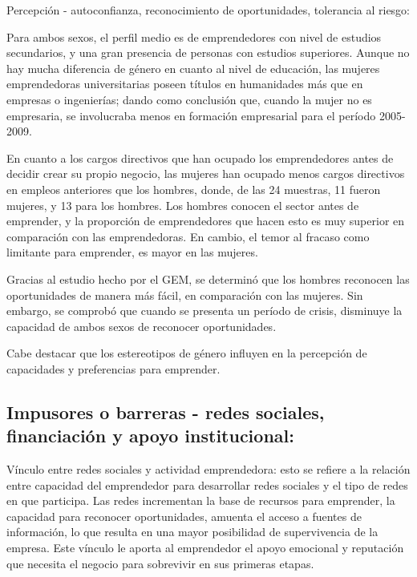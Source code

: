 \documentclass[
  letterpaper,
  DIV=11,
  numbers=noendperiod]{scrreprt}
\begin{document}
Percepción - autoconfianza, reconocimiento de oportunidades, tolerancia
al riesgo:

Para ambos sexos, el perfil medio es de emprendedores con nivel de
estudios secundarios, y una gran presencia de personas con estudios
superiores. Aunque no hay mucha diferencia de género en cuanto al nivel
de educación, las mujeres emprendedoras universitarias poseen títulos en
humanidades más que en empresas o ingenierías; dando como conclusión
que, cuando la mujer no es empresaria, se involucraba menos en formación
empresarial para el período 2005-2009.

En cuanto a los cargos directivos que han ocupado los emprendedores
antes de decidir crear su propio negocio, las mujeres han ocupado menos
cargos directivos en empleos anteriores que los hombres, donde, de las
24 muestras, 11 fueron mujeres, y 13 para los hombres. Los hombres
conocen el sector antes de emprender, y la proporción de emprendedores
que hacen esto es muy superior en comparación con las emprendedoras. En
cambio, el temor al fracaso como limitante para emprender, es mayor en
las mujeres.

Gracias al estudio hecho por el GEM, se determinó que los hombres
reconocen las oportunidades de manera más fácil, en comparación con las
mujeres. Sin embargo, se comprobó que cuando se presenta un período de
crisis, disminuye la capacidad de ambos sexos de reconocer
oportunidades.

Cabe destacar que los estereotipos de género influyen en la percepción
de capacidades y preferencias para emprender.

\hypertarget{impusores-o-barreras---redes-sociales-financiaciuxf3n-y-apoyo-institucional}{%
\subsection{Impusores o barreras - redes sociales, financiación y apoyo
institucional:}\label{impusores-o-barreras---redes-sociales-financiaciuxf3n-y-apoyo-institucional}}

Vínculo entre redes sociales y actividad emprendedora: esto se refiere a
la relación entre capacidad del emprendedor para desarrollar redes
sociales y el tipo de redes en que participa. Las redes incrementan la
base de recursos para emprender, la capacidad para reconocer
oportunidades, amuenta el acceso a fuentes de información, lo que
resulta en una mayor posibilidad de supervivencia de la empresa. Este
vínculo le aporta al emprendedor el apoyo emocional y reputación que
necesita el negocio para sobrevivir en sus primeras etapas.
\end{document}
